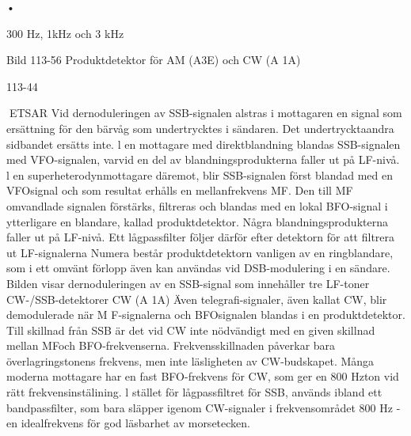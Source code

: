 {{{•

300 Hz, 1kHz och 3 kHz

Bild 113-56 Produktdetektor för AM (A3E) och CW (A 1A)

113-44

ETSAR
Vid dernoduleringen av SSB-signalen
alstras i mottagaren en signal som ersättning för den bärvåg som undertrycktes i
sändaren. Det undertrycktaandra sidbandet
ersätts inte.
l en mottagare med direktblandning blandas SSB-signalen med VFO-signalen, varvid en del av blandningsprodukterna faller ut
på LF-nivå.
l en superheterodynmottagare däremot,
blir SSB-signalen först blandad med en VFOsignal och som resultat erhålls en mellanfrekvens MF. Den till MF omvandlade signalen förstärks, filtreras och blandas med en
lokal BFO-signal i ytterligare en blandare,
kallad produktdetektor. Några blandningsprodukterna faller ut på LF-nivå. Ett lågpassfilter följer därför efter detektorn för att filtrera
ut LF-signalerna
Numera består produktdetektorn vanligen av en ringblandare, som i ett omvänt
förlopp även kan användas vid DSB-modulering i en sändare. Bilden visar dernoduleringen av en SSB-signal som innehåller tre
LF-toner
CW-/SSB-detektorer CW (A 1A)
Även telegrafi-signaler, även kallat CW, blir
demodulerade när M F-signalerna och BFOsignalen blandas i en produktdetektor.
Till skillnad från SSB är det vid CW inte nödvändigt med en given skillnad mellan MFoch BFO-frekvenserna. Frekvensskillnaden
påverkar bara överlagringstonens frekvens,
men inte läsligheten av CW-budskapet.
Många moderna mottagare har en fast
BFO-frekvens för CW, som ger en 800 Hzton vid rätt frekvensinstälining. l stället för
lågpassfiltret för SSB, används ibland ett
bandpassfilter, som bara släpper igenom
CW-signaler i frekvensområdet 800 Hz -en
idealfrekvens för god läsbarhet av morsetecken.

}}}
